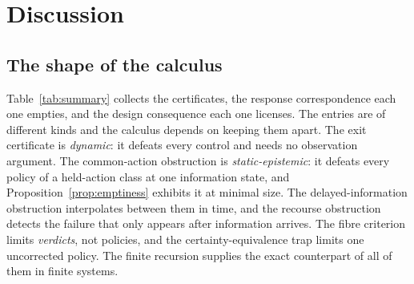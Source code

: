 \section{Discussion}\label{sec:discussion}

\subsection{The shape of the calculus}\label{sec:shape}

Table~\ref{tab:summary} collects the certificates, the response correspondence each one empties, and the design consequence each one licenses. The entries are of different kinds and the calculus depends on keeping them apart. The exit certificate is \emph{dynamic}: it defeats every control and needs no observation argument. The common-action obstruction is \emph{static-epistemic}: it defeats every policy of a held-action class at one information state, and Proposition~\ref{prop:emptiness} exhibits it at minimal size. The delayed-information obstruction interpolates between them in time, and the recourse obstruction detects the failure that only appears after information arrives. The fibre criterion limits \emph{verdicts}, not policies, and the certainty-equivalence trap limits one uncorrected policy. The finite recursion supplies the exact counterpart of all of them in finite systems.

